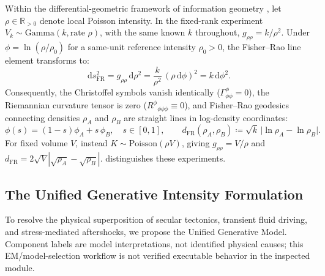 \begin{theorem}
  \label{thm:fisher_rao_flatness}
  Within the differential-geometric framework of information geometry
  \parencite{amari1985}, let $\rho \in \mathbb{R}_{>0}$ denote local
  Poisson intensity. In the fixed-rank experiment
  $V_k\sim\mathrm{Gamma}(k,\text{rate }\rho)$, with the same known
  $k$ throughout, $g_{\rho\rho}=k/\rho^2$. Under
  $\phi=\ln(\rho/\rho_0)$ for a same-unit reference intensity
  $\rho_0>0$, the Fisher--Rao line
  element transforms to:
  \begin{equation}
    \mathrm{d}s_{\mathrm{FR}}^2 = g_{\rho\rho}\,\mathrm{d}\rho^2 =
    \frac{k}{\rho^2}\,(\rho\,\mathrm{d}\phi)^2 = k\,\mathrm{d}\phi^2.
    \label{eq:fisher_metric_flat}
  \end{equation}
  Consequently, the Christoffel symbols vanish identically
  ($\Gamma^\phi_{\phi\phi} = 0$), the Riemannian curvature tensor is
  zero ($R^\phi{}_{\phi\phi\phi} \equiv 0$), and Fisher--Rao
  geodesics connecting densities $\rho_A$ and $\rho_B$ are straight
  lines in log-density coordinates:
  \begin{equation}
    \phi(s) = (1 - s)\phi_A + s\,\phi_B, \quad s \in [0, 1], \qquad
    d_{\mathrm{FR}}(\rho_A, \rho_B) \coloneqq \sqrt{k}\,\bigl|\ln \rho_A -
    \ln \rho_B\bigr|.
    \label{eq:geodesic_distance}
  \end{equation}
  For fixed volume $V$, instead $K\sim\mathrm{Poisson}(\rho V)$,
  giving $g_{\rho\rho}=V/\rho$ and
  $d_{\mathrm{FR}}=2\sqrt V|\sqrt{\rho_A}-\sqrt{\rho_B}|$.
   distinguishes these experiments.
\end{theorem}

\subsection{The Unified Generative Intensity Formulation}
\label{subsec:unified_model_spec}

To resolve the physical superposition of secular tectonics,
transient fluid driving, and stress-mediated aftershocks, we
propose the Unified Generative Model. Component labels are model
interpretations, not identified physical causes; this EM/model-selection
workflow is not verified executable behavior in the inspected module.

